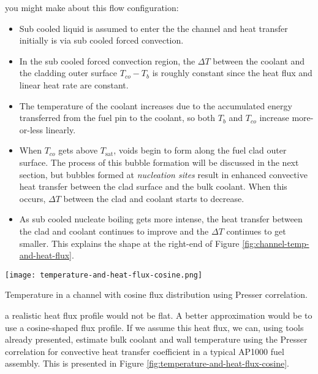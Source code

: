  you might make about this flow configuration:
\begin{itemize}
\item Sub cooled liquid is assumed to enter the the channel and heat transfer initially is via sub cooled forced convection.
\item In the sub cooled forced convection region, the $\Delta T$ between the coolant and the cladding outer surface $T_{co} - T_b$ is roughly constant since the heat flux and linear heat rate are constant.
\item The temperature of the coolant increases due to the accumulated energy transferred from the fuel pin to the coolant, so both $T_{b}$ and $T_{co}$ increase more-or-less linearly.
\item When $T_{co}$ gets above $T_{\text{sat}}$, voids begin to form along the fuel clad outer surface.  The process of this bubble formation will be discussed in the next section, but bubbles formed at \emph{nucleation sites} result in enhanced convective heat transfer between the clad surface and the bulk coolant.  When this occurs, $\Delta T$ between the clad and coolant starts to decrease.
\item As sub cooled nucleate boiling gets more intense, the heat transfer between the clad and coolant continues to improve and the $\Delta T$ continues to get smaller.  This explains the shape at the right-end of Figure \ref{fig:channel-temp-and-heat-flux}.
\end{itemize}

\begin{marginfigure}
\texttt{[image: temperature-and-heat-flux-cosine.png]}
\caption{Temperature in a channel with cosine flux distribution using Presser correlation.}
\label{fig:temperature-and-heat-flux-cosine}
\end{marginfigure}
 a realistic heat flux profile would not be flat.  A better approximation would be to use a cosine-shaped flux profile.  If we assume this heat flux, we can, using tools already presented, estimate bulk coolant and wall temperature using the Presser correlation for convective heat transfer coefficient in a typical AP1000 fuel assembly.  This is presented in Figure \ref{fig:temperature-and-heat-flux-cosine}.

